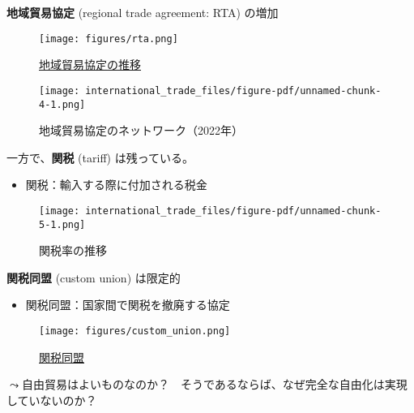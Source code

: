 \documentclass[
  xelatex,
  ja=standard]{bxjsarticle}
\providecommand{\tightlist}{%
  \setlength{\itemsep}{0pt}\setlength{\parskip}{0pt}}\usepackage{longtable,booktabs,array}
\begin{document}
\textbf{地域貿易協定} (regional trade agreement: RTA) の増加

\begin{figure}[htpb]

{\centering \texttt{[image: figures/rta.png]}

}

\caption{\href{https://rtais.wto.org/UI/charts.aspx}{地域貿易協定の推移}}

\end{figure}

\begin{figure}[htpb]

{\centering \texttt{[image: international\_trade\_files/figure-pdf/unnamed-chunk-4-1.png]}

}

\caption{地域貿易協定のネットワーク（2022年）\citep{egger2008}}

\end{figure}

一方で、\textbf{関税} (tariff) は残っている。

\begin{itemize}
\tightlist
\item
  関税：輸入する際に付加される税金
\end{itemize}

\begin{figure}[htpb]

{\centering \texttt{[image: international\_trade\_files/figure-pdf/unnamed-chunk-5-1.png]}

}

\caption{関税率の推移}

\end{figure}

\textbf{関税同盟} (custom union) は限定的

\begin{itemize}
\tightlist
\item
  関税同盟：国家間で関税を撤廃する協定
\end{itemize}

\begin{figure}[htpb]

{\centering \texttt{[image: figures/custom\_union.png]}

}

\caption{\href{https://commons.wikimedia.org/wiki/File:Customs_Unions_World.svg}{関税同盟}}

\end{figure}

\(\leadsto\)自由貿易はよいものなのか？　そうであるならば、なぜ完全な自由化は実現していないのか？
\end{document}
